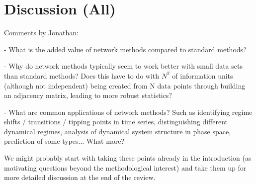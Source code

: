 \section{Discussion {\bf{(All)}}}

Comments by Jonathan:

- What is the added value of network methods compared to standard methods?

- Why do network methods typically seem to work better with small data sets than
standard methods? Does this have to do with $N^2$ of information units (although
not independent) being created from N data points through building an adjacency
matrix, leading to more robust statistics?

- What are common applications of network methods? Such as identifying regime
shifts / transitions / tipping points in time series, distinguishing different
dynamical regimes, analysis of dynamical system structure in phase space,
prediction of some types... What more?

We might probably start with taking these points already in the introduction (as
motivating questions beyond the methodological interest) and take them up for
more detailed discussion at the end of the review.
